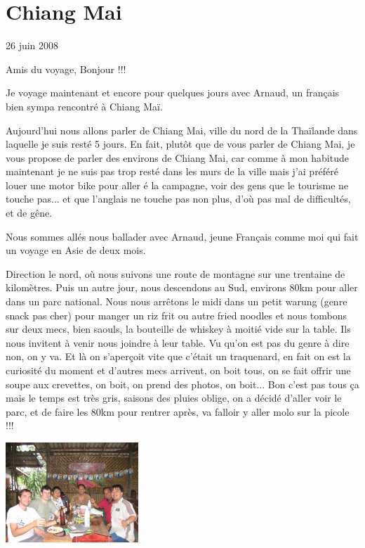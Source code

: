 \section{Chiang Mai}

26 juin 2008

\begin{multicols}{2}

Amis du voyage, Bonjour !!!

Je voyage maintenant et encore pour quelques jours avec Arnaud, un français bien sympa rencontré à Chiang Maï.

Aujourd'hui nous allons parler de Chiang Mai, ville du nord de la Thaïlande dans laquelle je suis resté 5 jours. En fait, plutôt que de vous parler de Chiang Mai, je vous propose de parler des environs de Chiang Mai, car comme à mon habitude maintenant je ne suis pas trop resté dans les murs de la ville mais j'ai préféré louer une motor bike pour aller é la campagne, voir des gens que le tourisme ne touche pas... et que l'anglais ne touche pas non plus, d'où pas mal de difficultés, et de gêne.

Nous sommes allés nous ballader avec Arnaud, jeune Français comme moi qui fait un voyage en Asie de deux mois.

Direction le nord, où nous suivons une route de montagne sur une trentaine de kilomètres. Puis un autre jour, nous descendons au Sud, environs 80km pour aller dans un parc national. Nous nous arrêtons le midi dans un petit warung (genre snack pas cher) pour manger un riz frit ou autre fried noodles et nous tombons sur deux mecs, bien saouls, la bouteille de whiskey à moitié vide sur la table. Ils nous invitent à venir nous joindre à leur table. Vu qu'on est pas du genre à dire non, on y va. Et là on s'aperçoit vite que c'était un traquenard, en fait on est la curiosité du moment et d'autres mecs arrivent, on boit tous, on se fait offrir une soupe aux crevettes, on boit, on prend des photos, on boit... Bon c'est pas tous ça mais le temps est très gris, saisons des pluies oblige, on a décidé d'aller voir le parc, et de faire les 80km pour rentrer après, va falloir y aller molo sur la picole !!!

\smallbreak
\hspace*{-0.65cm}
\includegraphics[width=5cm]{articles/Chiang-mai/1214286196a5oS.jpg}
\smallbreak


\end{multicols}
